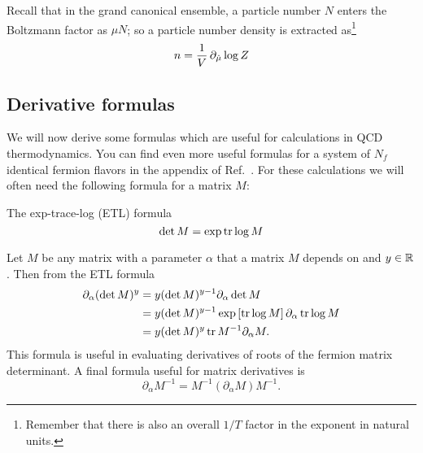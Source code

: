 Recall that in the grand canonical ensemble, a particle number
$N$ enters the Boltzmann factor as $\mu N$; so a particle number density 
is extracted as\footnote{Remember that there is also
an overall $1/T$ factor in the exponent in natural units.}
\begin{equation}
  n = \frac{1}{V}\,\partial_{\hat{\mu}}\log Z
\end{equation}

\subsection{Derivative formulas}

We will now derive some formulas which are useful for calculations in QCD
thermodynamics. You can find even more useful formulas for a system of 
$N_f$ identical
fermion flavors in the appendix of Ref.~\cite{allton_thermodynamics_2005}.
For these calculations we will often need the following formula for a
matrix $M$:
\begin{theorem}{The exp-trace-log (ETL) formula}{}\label{thm:exptrlog} 
  $$\det M = \exp \tr \log M$$
\end{theorem}
Let $M$ be any matrix with a parameter $\alpha$ that a matrix 
$M$ depends on and $y\in\mathbb{R}$. Then from the ETL formula
\begin{equation}\begin{aligned}
  \partial_\alpha(\det M)^y &= y(\det M)^{y-1}\partial_\alpha\det M\\
      &= y(\det M)^{y-1}\exp\left[\tr\log M\right]\partial_\alpha\tr\log M\\
      &= y(\det M)^y \tr M^{-1}\partial_\alpha M.
\end{aligned}\end{equation}
This formula is useful in evaluating derivatives of roots of the fermion
matrix determinant. A final formula useful for matrix derivatives is
\begin{equation}
  \partial_\alpha M^{-1} = M^{-1}\left(\partial_\alpha M\right) M^{-1}.
\end{equation}

